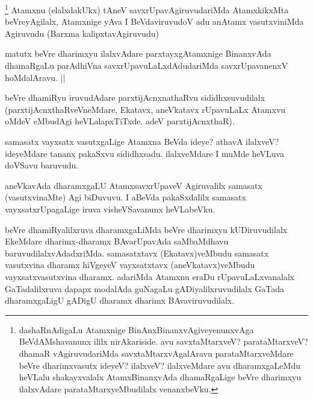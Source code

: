 \begin{artha}
\footnote{dashaRnAdigaLu Atamxnige BinAnxBinanxvAgiveyenunxvAga BeVdAMshavanunx ililx nirAkariside. avu savxtaMtarxveV? parataMtarxveV? dhamaR vAgiruvudariMda savxtaMtarxvAgalAravu parataMtarxveMdare beVre dharimxvasutx ideyeV? ilalxveV? ilalxveMdare avu dharamxgaLeMdu heVLalu shakayxvalalx AtamxBinanxvAda dhamaRgaLige beVre dharimxyu ilalxvAdare parataMtarxyeMbudilalx venanxbeVku.}
Atamxnu (elalxdakUkx) tAneV savxrUpavAgiruvudariMda AtamxkikxMta beVreyAgilalx, Atamxnige yAva I BeVdaviruvudoV adu anAtamx vasutxviniMda Agiruvudu (Barxma kalipxtavAgiruvudu)
\end{artha}

\begin{artha}
matutx beVre dharimxyu ilalxvAdare parxtayxgAtamxnige BinanxvAda dhamaRgaLu parAdhiVna savxrUpavuLaLxdAdudariMda savxrUpavanenxV hoMdalAravu. ||
\end{artha}

\begin{artha}
beVre dhamiRyu iruvudAdare parxtijAcnxnathaRvu sididhxsuvudilalx (parxtijAcnxthaRveVneMdare, Ekatavx, aneVkatavx rUpavuLaLx Atamxvu oMdeV eMbudAgi heVLalapxTiTxde. adeV parxtijAcnxthaR).
\end{artha}

\begin{artha}
samasatx vayxsatx vasutxgaLige Atamxna BeVda ideye? athavA ilalxveV? ideyeMdare tananx pakaSxvu sididhxsadu. ilalxveMdare I muMde heVLuva doVSavu baruvudu.
\end{artha}

\begin{artha}
aneVkavAda dharamxgaLU AtamxsavxrUpaveV Agiruvalilx samasatx (vasutxvinaMte) Agi biDuvuvu. I aBeVda pakaSxdalilx samasatx vayxsatxrUpagaLige iruva visheVSavanunx heVLabeVku.
\end{artha}


\begin{artha}
beVre dhamiRyalilxruva dharamxgaLiMda beVre dharimxyu kUDiruvudilalx EkeMdare dharimx-dharamx BAvarUpavAda saMbaMdhavu baruvudilalxvAdadxriMda. samasatxtavx (Ekatavx)veMbudu samasatx vasutxvina dharamx hiVgeyeV vayxsatxtavx (aneVkatavx)veMbudu vayxsatxvasutxvina dharamx. adariMda Atamxnu eraDu rUpavuLaLxvanalalx GaTadalilxruva dapapx modalAda guNagaLu gADiyalilxruvudilalx GaTada dharamxgaLigU gADigU dharamx dharimx BAvaviruvudilalx.
\end{artha}

